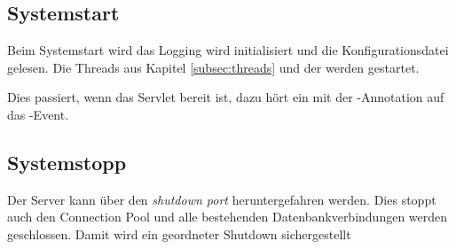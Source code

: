 \subsection{Systemstart}\label{subsec:systemstart}
Beim Systemstart wird das Logging wird initialisiert und die Konfigurationsdatei gelesen. Die Threads aus Kapitel \ref{subsec:threads} und der  werden gestartet.

Dies passiert, wenn das Servlet bereit ist, dazu hört ein  mit der -Annotation auf das -Event.

\subsection{Systemstopp}\label{subsec:systemstopp}
Der Server kann über den \emph{shutdown port} heruntergefahren werden. Dies stoppt auch den Connection Pool und alle bestehenden Datenbankverbindungen werden geschlossen. Damit wird ein geordneter Shutdown sichergestellt
